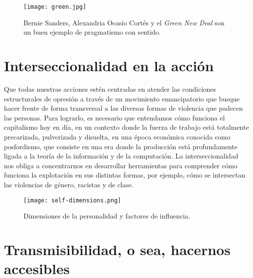 \begin{figure}[htbp]
	\centering	\texttt{[image: green.jpg]}
	\caption[Buen ejemplo de pragmatismo con sentido.]{Bernie Sanders, Alexandria Ocasio Cortés y el \emph{Green New Deal} son un buen ejemplo de pragmatismo con sentido.}
\end{figure}

\section{Interseccionalidad en la acción}
\label{sec:interseccionalidad}

Que todas nuestras acciones estén centradas en atender las condiciones estructurales de opresión a través de un movimiento emancipatorio que busque hacer frente de forma transversal a las diversas formas de violencia que padecen las personas. Para lograrlo, es necesario que entendamos cómo funciona el capitalismo hoy en día, en un contexto donde la fuerza de trabajo está totalmente precarizada, pulverizada y disuelta, en una época económica conocida como posfordismo, que consiste en una era donde la producción está profundamente ligada a la teoría de la información y de la computación. La interseccionalidad nos obliga a concentrarnos en desarrollar herramientas para comprender cómo funciona la explotación en sus distintas formas, por ejemplo, cómo se intersectan las violencias de género, racistas y de clase.

\begin{figure}[htbp]
	\centering
	\texttt{[image: self-dimensions.png]}
	\caption[Dimensiones de la personalidad.]{Dimensiones de la personalidad y factores de influencia.}
	\label{fig:dimensiones}
\end{figure}

\section{Transmisibilidad, o sea, hacernos accesibles}
\label{sec:transmisibilidad}

